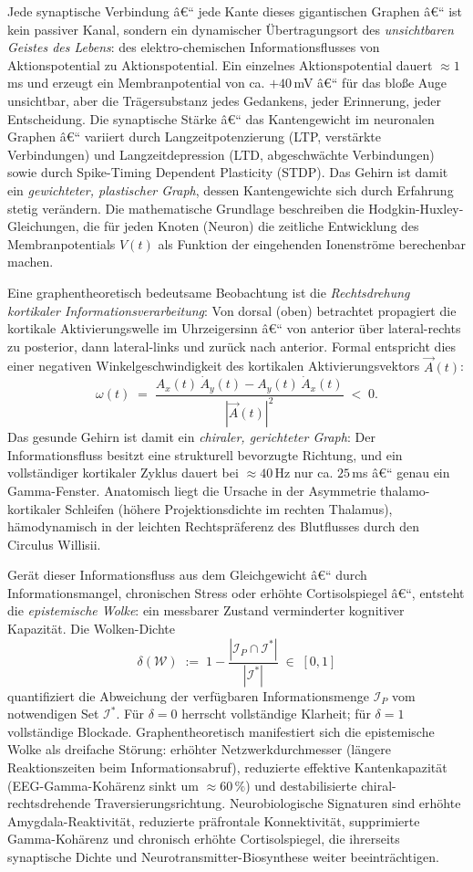 ﻿\documentclass[a4paper,12pt]{article}
\theoremstyle{definition}
\begin{document}
	Jede synaptische Verbindung â€“ jede Kante dieses gigantischen Graphen â€“ ist kein passiver Kanal, sondern ein dynamischer Übertragungsort des \emph{unsichtbaren Geistes des Lebens}: des elektro-chemischen Informationsflusses von Aktionspotential zu Aktionspotential. Ein einzelnes Aktionspotential dauert $\approx 1$\,ms und erzeugt ein Membranpotential von ca. $+40$\,mV â€“ für das bloße Auge unsichtbar, aber die Trägersubstanz jedes Gedankens, jeder Erinnerung, jeder Entscheidung. Die synaptische Stärke â€“ das Kantengewicht im neuronalen Graphen â€“ variiert durch Langzeitpotenzierung (LTP, verstärkte Verbindungen) und Langzeitdepression (LTD, abgeschwächte Verbindungen) sowie durch Spike-Timing Dependent Plasticity (STDP). Das Gehirn ist damit ein \emph{gewichteter, plastischer Graph}, dessen Kantengewichte sich durch Erfahrung stetig verändern. Die mathematische Grundlage beschreiben die Hodgkin-Huxley-Gleichungen, die für jeden Knoten (Neuron) die zeitliche Entwicklung des Membranpotentials $V(t)$ als Funktion der eingehenden Ionenströme berechenbar machen.

	Eine graphentheoretisch bedeutsame Beobachtung ist die \emph{Rechtsdrehung kortikaler Informationsverarbeitung}: Von dorsal (oben) betrachtet propagiert die kortikale Aktivierungswelle im Uhrzeigersinn â€“ von anterior über lateral-rechts zu posterior, dann lateral-links und zurück nach anterior. Formal entspricht dies einer negativen Winkelgeschwindigkeit des kortikalen Aktivierungsvektors $\vec{A}(t)$:
	\[
	\omega(t) \;=\; \frac{A_x(t)\,\dot{A}_y(t) - A_y(t)\,\dot{A}_x(t)}{|\vec{A}(t)|^2} \;<\; 0.
	\]
	Das gesunde Gehirn ist damit ein \emph{chiraler, gerichteter Graph}: Der Informationsfluss besitzt eine strukturell bevorzugte Richtung, und ein vollständiger kortikaler Zyklus dauert bei $\approx 40$\,Hz nur ca. $25$\,ms â€“ genau ein Gamma-Fenster. Anatomisch liegt die Ursache in der Asymmetrie thalamo-kortikaler Schleifen (höhere Projektionsdichte im rechten Thalamus), hämodynamisch in der leichten Rechtspräferenz des Blutflusses durch den Circulus Willisii.

	Gerät dieser Informationsfluss aus dem Gleichgewicht â€“ durch Informationsmangel, chronischen Stress oder erhöhte Cortisolspiegel â€“, entsteht die \emph{epistemische Wolke}: ein messbarer Zustand verminderter kognitiver Kapazität. Die Wolken-Dichte
	\[
	\delta(\mathcal{W}) \;:=\; 1 - \frac{|\mathcal{I}_P \cap \mathcal{I}^*|}{|\mathcal{I}^*|} \;\in\; [0,1]
	\]
	quantifiziert die Abweichung der verfügbaren Informationsmenge $\mathcal{I}_P$ vom notwendigen Set $\mathcal{I}^*$. Für $\delta = 0$ herrscht vollständige Klarheit; für $\delta = 1$ vollständige Blockade. Graphentheoretisch manifestiert sich die epistemische Wolke als dreifache Störung: erhöhter Netzwerkdurchmesser (längere Reaktionszeiten beim Informationsabruf), reduzierte effektive Kantenkapazität (EEG-Gamma-Kohärenz sinkt um $\approx 60\,\%$) und destabilisierte chiral-rechtsdrehende Traversierungsrichtung. Neurobiologische Signaturen sind erhöhte Amygdala-Reaktivität, reduzierte präfrontale Konnektivität, supprimierte Gamma-Kohärenz und chronisch erhöhte Cortisolspiegel, die ihrerseits synaptische Dichte und Neurotransmitter-Biosynthese weiter beeinträchtigen.
\end{document}
